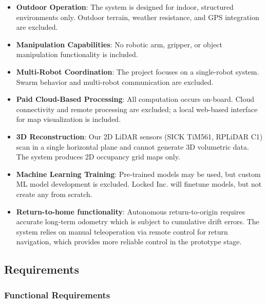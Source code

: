 \begin{itemize}
    \item \textbf{Outdoor Operation}: The system is designed for indoor, structured environments only. Outdoor terrain, weather resistance, and GPS integration are excluded.

    \item \textbf{Manipulation Capabilities}: No robotic arm, gripper, or object manipulation functionality is included.

    \item \textbf{Multi-Robot Coordination}: The project focuses on a single-robot system. Swarm behavior and multi-robot communication are excluded.

    \item \textbf{Paid Cloud-Based Processing}: All computation occurs on-board. Cloud connectivity and remote processing are excluded; a local web-based interface for map visualization is included.

    \item \textbf{3D Reconstruction}: Our 2D LiDAR sensors (SICK TiM561, RPLiDAR C1) scan in a single horizontal plane and cannot generate 3D volumetric data. The system produces 2D occupancy grid maps only.

    \item \textbf{Machine Learning Training}: Pre-trained models may be used, but custom ML model development is excluded. Locked Inc. will finetune models, but not create any from scratch.

    \item \textbf{Return-to-home functionality}: Autonomous return-to-origin requires accurate long-term odometry which is subject to cumulative drift errors. The system relies on manual teleoperation via remote control for return navigation, which provides more reliable control in the prototype stage.
\end{itemize}

\subsection{Requirements}

\subsubsection{Functional Requirements}


